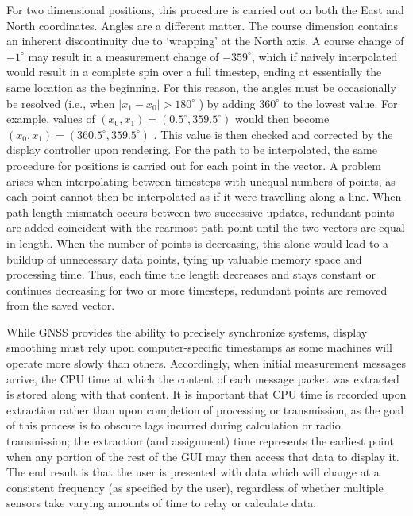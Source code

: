 \documentclass[twocolumn,10pt]{article}
\begin{document}
  For two dimensional positions, this procedure is carried out on both the East and North coordinates. 
  Angles are a different matter. The course dimension contains an inherent discontinuity due to `wrapping' at the North axis. A course change of $-1^\circ$ may result in a measurement change of $-359^\circ$, which if naively interpolated would result in a complete spin over a full timestep, ending at essentially the same location as the beginning. For this reason, the angles must be occasionally be resolved (i.e., when $|x_1 - x_0| > 180^\circ$ ) by adding $360^\circ$ to the lowest value. For example, values of $(x_0, x_1) = (0.5^\circ, 359.5^\circ)$ would then become $(x_0, x_1) = (360.5^\circ, 359.5^\circ)$ .  This value is then checked and corrected by the display controller upon rendering.
  For the path to be interpolated,  the same procedure for positions is carried out for each point in the vector. A problem arises when interpolating between timesteps with unequal numbers of points, as each point cannot then be interpolated as if it were travelling along a line. When path length mismatch occurs between two successive updates, redundant points are added coincident with the rearmost path point until the two vectors are equal in length. When the number of points is decreasing, this alone would lead to a buildup of unnecessary data points, tying up valuable memory space and processing time. Thus, each time the length decreases and stays constant or continues decreasing for two or more timesteps, redundant points are removed from the saved vector.

  While GNSS provides the ability to precisely synchronize systems, display smoothing must rely upon computer-specific timestamps as some machines will operate more slowly than others. Accordingly, when initial measurement messages arrive, the CPU time at which the content of each message packet was extracted is stored along with that content. It is important that CPU time is recorded upon extraction rather than upon completion of processing or transmission, as the goal of this process is to obscure lags incurred during calculation or radio transmission; the extraction (and assignment) time represents the earliest point when any portion of the rest of the GUI may then access that data to display it. The end result is that the user is presented with data which will change at a consistent frequency (as specified by the user), regardless of whether multiple sensors take varying amounts of time to relay or calculate data.
\end{document}
